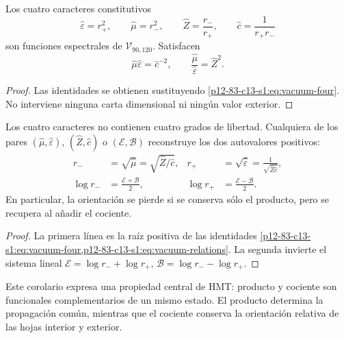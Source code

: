 \begin{theorem}
Los cuatro caracteres constitutivos
\begin{equation}
\widehat\varepsilon=r_+^2,\qquad
\widehat\mu=r_-^2,\qquad
\widehat Z=\frac{r_-}{r_+},\qquad
\widehat c=\frac1{r_+r_-}
\label{p12-83-c13-s1:eq:vacuum-four}
\end{equation}
son funciones espectrales de \(\mathcal V_{90,120}\). Satisfacen
\begin{equation}
\widehat\mu\widehat\varepsilon=\widehat c^{-2},
\qquad
\frac{\widehat\mu}{\widehat\varepsilon}=\widehat Z^2.
\label{p12-83-c13-s1:eq:vacuum-relations}
\end{equation}
\end{theorem}

\begin{proof}
Las identidades se obtienen sustituyendo \cref{p12-83-c13-s1:eq:vacuum-four}. No interviene ninguna carta dimensional ni ning\'un valor exterior.
\end{proof}

\begin{corollary}
Los cuatro caracteres no contienen cuatro grados de libertad. Cualquiera de
los pares \((\widehat\mu,\widehat\varepsilon)\),
\((\widehat Z,\widehat c)\) o \((\mathcal E,\mathcal B)\) reconstruye los
dos autovalores positivos:
\begin{align}
r_-&=\sqrt{\widehat\mu}
=\sqrt{\widehat Z/\widehat c},
&r_+&=\sqrt{\widehat\varepsilon}
=\frac1{\sqrt{\widehat Z\widehat c}},
\label{p12-83-c13-s1:eq:vacuum-reconstruct-r}\\
\log r_-&=\frac{\mathcal E+\mathcal B}{2},
&\log r_+&=\frac{\mathcal E-\mathcal B}{2}.
\label{p12-83-c13-s1:eq:vacuum-reconstruct-log}
\end{align}
En particular, la orientaci\'on se pierde si se conserva s\'olo el producto,
pero se recupera al a\~nadir el cociente.
\end{corollary}

\begin{proof}
La primera l\'inea es la ra\'iz positiva de las identidades
\cref{p12-83-c13-s1:eq:vacuum-four,p12-83-c13-s1:eq:vacuum-relations}. La segunda invierte el sistema
lineal
\(\mathcal E=\log r_-+\log r_+\),
\(\mathcal B=\log r_--\log r_+\).
\end{proof}

Este corolario expresa una propiedad central de HMT: producto y cociente son
funcionales complementarios de un mismo estado. El producto determina la
propagaci\'on com\'un, mientras que el cociente conserva la orientaci\'on
relativa de las hojas interior y exterior.

